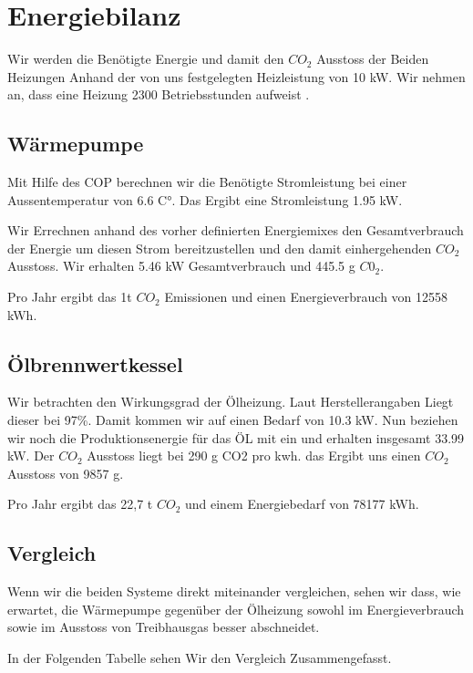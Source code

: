 \chapter{Energiebilanz}
\label{chap:bilanz}

Wir werden die Benötigte Energie und damit den $CO_2$ Ausstoss der Beiden
Heizungen Anhand der von uns festgelegten Heizleistung von 10 kW.
Wir nehmen an, dass eine Heizung 2300 Betriebsstunden aufweist
\cite{heizung:heizung}.

\section{Wärmepumpe}

Mit Hilfe des COP berechnen wir die Benötigte Stromleistung bei einer
Aussentemperatur von 6.6 C°.
Das Ergibt eine Stromleistung 1.95 kW.

Wir Errechnen anhand des vorher definierten Energiemixes den Gesamtverbrauch
der Energie um diesen Strom bereitzustellen und den damit einhergehenden $CO_2$
Ausstoss.
Wir erhalten 5.46 kW Gesamtverbrauch und 445.5 g $C0_2$.

Pro Jahr ergibt das 1t $CO_2$ Emissionen und einen Energieverbrauch von 12558 kWh.

\section{Ölbrennwertkessel}

Wir betrachten den Wirkungsgrad der Ölheizung.
Laut Herstellerangaben Liegt dieser bei 97\%.
Damit kommen wir auf einen Bedarf von 10.3 kW.
Nun beziehen wir noch die Produktionsenergie für das ÖL mit ein und erhalten
insgesamt 33.99 kW.
Der $CO_2$ Ausstoss liegt bei 290 g CO2 pro kwh.\cite{heizung:co2vergleich}
das Ergibt uns einen $CO_2$ Ausstoss von 9857 g.

Pro Jahr ergibt das 22,7 t $CO_2$ und einem Energiebedarf von 78177 kWh.


\section{Vergleich}

Wenn wir die beiden Systeme direkt miteinander vergleichen, sehen wir dass,
wie erwartet, die Wärmepumpe gegenüber der Ölheizung
sowohl im Energieverbrauch sowie im Ausstoss von Treibhausgas besser abschneidet.

In der Folgenden Tabelle sehen Wir den Vergleich Zusammengefasst.

